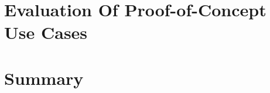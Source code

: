 \section{Evaluation Of Proof-of-Concept Use Cases}











\section{Summary}







%
%
%
%
%
%
%
